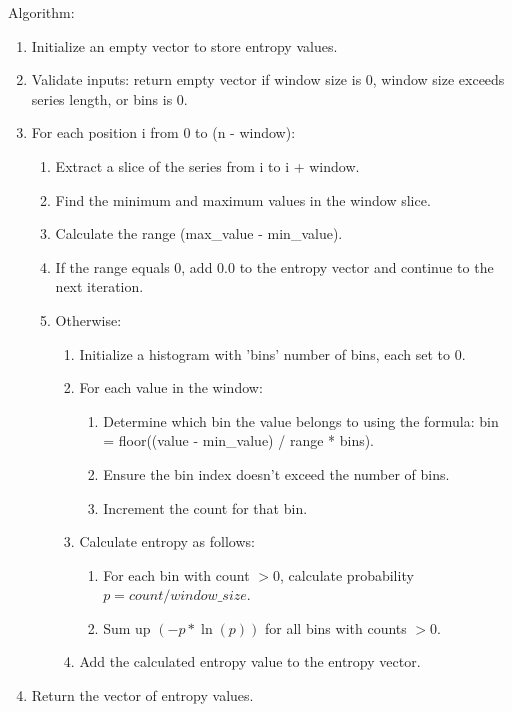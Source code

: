 Algorithm:
\begin{enumerate}
    \item Initialize an empty vector to store entropy values.
    \item Validate inputs: return empty vector if window size is 0, window size exceeds series length, or bins is 0.
    \item For each position i from 0 to (n - window):
        \begin{enumerate}
            \item Extract a slice of the series from i to i + window.
            \item Find the minimum and maximum values in the window slice.
            \item Calculate the range (max\_value - min\_value).
            \item If the range equals 0, add 0.0 to the entropy vector and continue to the next iteration.
            \item Otherwise:
                \begin{enumerate}
                    \item Initialize a histogram with 'bins' number of bins, each set to 0.
                    \item For each value in the window:
                        \begin{enumerate}
                            \item Determine which bin the value belongs to using the formula: bin = floor((value - min\_value) / range * bins).
                            \item Ensure the bin index doesn't exceed the number of bins.
                            \item Increment the count for that bin.
                        \end{enumerate}
                    \item Calculate entropy as follows:
                        \begin{enumerate}
                            \item For each bin with count $> 0$, calculate probability $p = count / window\_size$.
                            \item Sum up $(-p * \ln(p))$ for all bins with counts $> 0$.
                        \end{enumerate}
                    \item Add the calculated entropy value to the entropy vector.
                \end{enumerate}
        \end{enumerate}
    \item Return the vector of entropy values.
\end{enumerate}